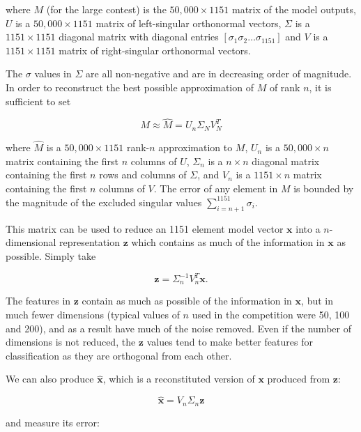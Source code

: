 \documentclass{article}
\begin{document}
where $M$ (for the large contest) is the $50,000 \times 1151$ matrix of the model outputs, $U$ is a $50,000 \times 1151$ matrix of left-singular orthonormal vectors, $\Sigma$ is a $1151 \times 1151$ diagonal matrix with diagonal entries $[ \sigma_1 \sigma_2 \ldots \sigma_{1151}]$ and $V$ is a $1151 \times 1151$ matrix of right-singular orthonormal vectors.

The $\sigma$ values in $\Sigma$ are all non-negative and are in decreasing order of magnitude.  In order to reconstruct the best possible approximation of $M$ of rank $n$, it is sufficient to set

\begin{equation}
M \approx \hat{M} = U_n \Sigma_N V_N^T
\end{equation}

where $\hat{M}$ is a $50,000 \times 1151$ rank-$n$ approximation to $M$, $U_n$ is a $50,000 \times n$ matrix containing the first $n$ columns of $U$, $\Sigma_n$ is a $n \times n$ diagonal matrix containing the first $n$ rows and columns of $\Sigma$, and $V_n$ is a $1151 \times n$ matrix containing the first $n$ columns of $V$.  The error of any element in $M$ is bounded by the magnitude of the excluded singular values $\sum_{i=n+1}^{1151} \sigma_i$.

This matrix can be used to reduce an 1151 element model vector $\mathbf{x}$ into a $n$-dimensional representation $\mathbf{z}$ which contains as much of the information in $\mathbf{x}$ as possible.  Simply take

\begin{equation}
\label{eqn:svd-encode}
\mathbf{z} = \Sigma_n^{-1} V_n^T \mathbf{x} .
\end{equation}

The features in $\mathbf{z}$ contain as much as possible of the information in $\mathbf{x}$, but in much fewer dimensions (typical values of $n$ used in the competition were 50, 100 and 200), and as a result have much of the noise removed.  Even if the number of dimensions is not reduced, the $\mathbf{z}$ values tend to make better features for classification as they are orthogonal from each other.

We can also produce $\hat{\mathbf{x}}$, which is a reconstituted version of $\mathbf{x}$ produced from $\mathbf{z}$:

\begin{equation}
\hat{\mathbf{x}} = V_n \Sigma_n \mathbf{z}
\end{equation}

and measure its error:
\end{document}
